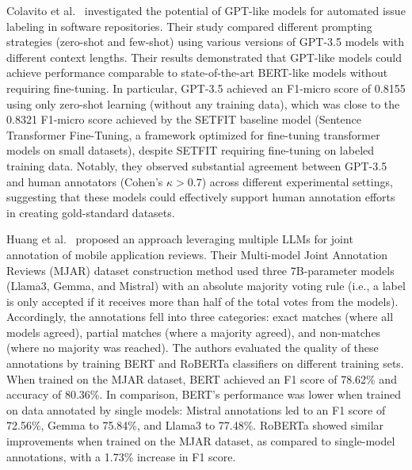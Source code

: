 \documentclass[11pt]{article}
\begin{document}
Colavito et al.~\cite{DBLP:conf/msr/ColavitoLNQ24} investigated the potential of GPT-like models for automated issue labeling in software repositories. 
Their study compared different prompting strategies (zero-shot and few-shot) using various versions of GPT-3.5 models with different context lengths. 
Their results demonstrated that GPT-like models could achieve performance comparable to state-of-the-art BERT-like models without requiring fine-tuning. 
In particular, GPT-3.5 achieved an F1-micro score of 0.8155 using only zero-shot learning (without any training data), which was close to the 0.8321 F1-micro score achieved by the SETFIT baseline model (Sentence Transformer Fine-Tuning, a framework optimized for fine-tuning transformer models on small datasets), despite SETFIT requiring fine-tuning on labeled training data.
Notably, they observed substantial agreement between GPT-3.5 and human annotators (Cohen's $\kappa > 0.7$) across different experimental settings, suggesting that these models could effectively support human annotation efforts in creating gold-standard datasets.

Huang et al.~\cite{Huang2023Enhancing} proposed an approach leveraging multiple LLMs for joint annotation of mobile application reviews. 
Their Multi-model Joint Annotation Reviews (MJAR) dataset construction method used three 7B-parameter models (Llama3, Gemma, and Mistral) with an absolute majority voting rule (i.e., a label is only accepted if it receives more than half of the total votes from the models). 
Accordingly, the annotations fell into three categories: exact matches (where all models agreed), partial matches (where a majority agreed), and non-matches (where no majority was reached). 
The authors evaluated the quality of these annotations by training BERT and RoBERTa classifiers on different training sets. 
When trained on the MJAR dataset, BERT achieved an F1 score of 78.62\% and accuracy of 80.36\%. 
In comparison, BERT's performance was lower when trained on data annotated by single models: Mistral annotations led to an F1 score of 72.56\%, Gemma to 75.84\%, and Llama3 to 77.48\%.
RoBERTa showed similar improvements when trained on the MJAR dataset, as compared to single-model annotations, with a 1.73\% increase in F1 score.
\end{document}
